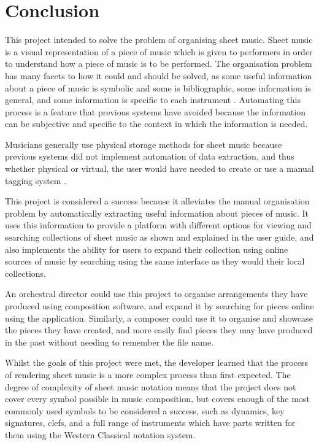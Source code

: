 \section{Conclusion}
This project intended to solve the problem of organising sheet music. Sheet music is a visual representation of a piece of music which is given to performers in order to understand how a piece of music is to be performed. The organisation problem has many facets to how it could and should be solved, as some useful information about a piece of music is symbolic and some is bibliographic, some information is general, and some information is specific to each instrument \parencite{MIR}. Automating this process is a feature that previous systems have avoided because the information can be subjective and specific to the context in which the information is needed.

Musicians generally use physical storage methods for sheet music because previous systems did not implement automation of data extraction, and thus whether physical or virtual, the user would have needed to create or use a manual tagging system \parencite{musicOrganising}.

This project is considered a success because it alleviates the manual organisation problem by automatically extracting useful information about pieces of music. It uses this information to provide a platform with different options for viewing and searching collections of sheet music as shown and explained in the user guide, and also implements the ability for users to expand their collection using online sources of music by searching using the same interface as they would their local collections.

An orchestral director could use this project to organise arrangements they have produced using composition software, and expand it by searching for pieces online using the application. Similarly, a composer could use it to organise and showcase the pieces they have created, and more easily find pieces they may have produced in the past without needing to remember the file name. 

Whilst the goals of this project were met, the developer learned that the process of rendering sheet music is a more complex process than first expected. The degree of complexity of sheet music notation means that the project does not cover every symbol possible in music composition, but covers enough of the most commonly used symbols to be considered a success, such as dynamics, key signatures, clefs, and a full range of instruments which have parts written for them using the Western Classical notation system.


